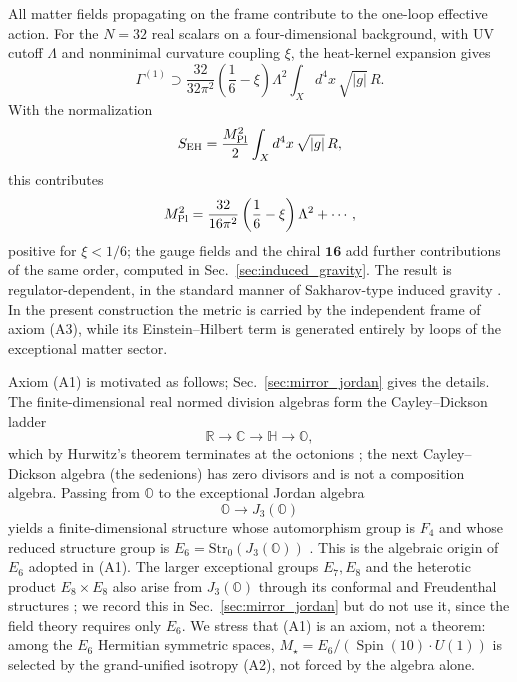 \documentclass[aps,prd,preprint,longbibliography,nofootinbib,superscriptaddress,floatfix]{revtex4-2}
\newcommand{\Spin}{\operatorname{Spin}}
\begin{document}
All matter fields propagating on the frame contribute to the one-loop effective
action. For the \(N=32\) real scalars on a four-dimensional background, with UV
cutoff \(\Lambda\) and nonminimal curvature coupling \(\xi\), the heat-kernel
expansion gives
\begin{equation}
    \Gamma^{(1)}
    \supset
    \frac{32}{32\pi^2}
    \left(\frac16-\xi\right)
    \Lambda^2
    \int_X d^4x\,\sqrt{|g|}\,R .
    \label{eq:induced_gravity_intro}
\end{equation}
With the normalization
\begin{equation}
    S_{\rm EH}
    =
    \frac{M_{\rm Pl}^2}{2}
    \int_X d^4x\,\sqrt{|g|}\,R,
    \label{eq:eh_normalization_intro}
\end{equation}
this contributes
\begin{equation}
    M_{\rm Pl}^2
    =
    \frac{32}{16\pi^2}
    \left(\frac16-\xi\right)\Lambda^2
    +\cdots ,
    \label{eq:planck_intro}
\end{equation}
positive for \(\xi<1/6\); the gauge fields and the chiral \(\mathbf{16}\) add
further contributions of the same order, computed in
Sec.~\ref{sec:induced_gravity}. The result is regulator-dependent, in the
standard manner of Sakharov-type induced gravity \cite{SakharovInducedGravity,
AdlerInducedGravity,DeWittDynamicalTheory,BirrellDavies,GilkeyInvariance}. In
the present construction the metric is carried by the independent frame of axiom
(A3), while its Einstein--Hilbert term is generated entirely by loops of the
exceptional matter sector.

Axiom (A1) is motivated as follows; Sec.~\ref{sec:mirror_jordan} gives the
details. The finite-dimensional real normed division algebras form the
Cayley--Dickson ladder
\begin{equation}
    \mathbb R
    \longrightarrow
    \mathbb C
    \longrightarrow
    \mathbb H
    \longrightarrow
    \mathbb O ,
    \label{eq:hurwitz_ladder_intro}
\end{equation}
which by Hurwitz's theorem terminates at the octonions
\cite{Hurwitz,SpringerVeldkamp,BaezOctonions}; the next Cayley--Dickson algebra
(the sedenions) has zero divisors and is not a composition algebra. Passing
from \(\mathbb O\) to the exceptional Jordan algebra
\begin{equation}
    \mathbb O
    \longrightarrow
    J_3(\mathbb O)
    \label{eq:jordan_exit_intro}
\end{equation}
yields a finite-dimensional structure whose automorphism group is \(F_4\) and
whose reduced structure group is \(E_6=\mathrm{Str}_0(J_3(\mathbb O))\)
\cite{JordanVonNeumannWigner,SpringerVeldkamp}. This is the algebraic origin of
\(E_6\) adopted in (A1). The larger exceptional groups \(E_7,E_8\) and the
heterotic product \(E_8\times E_8\) also arise from \(J_3(\mathbb O)\) through
its conformal and Freudenthal structures \cite{Freudenthal}; we record this in
Sec.~\ref{sec:mirror_jordan} but do not use it, since the field theory requires
only \(E_6\). We stress that (A1) is an axiom, not a theorem: among the \(E_6\)
Hermitian symmetric spaces, \(M_\star=E_6/(\Spin(10)\cdot U(1))\) is selected by
the grand-unified isotropy (A2), not forced by the algebra alone.
\end{document}
